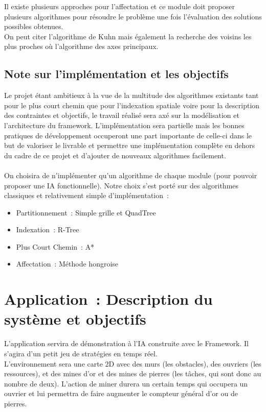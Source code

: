 Il existe plusieurs approches pour l'affectation et ce module doit proposer plusieurs algorithmes pour résoudre le problème une fois l'évaluation des solutions possibles obtenues.\\
On peut citer l'algorithme de Kuhn mais également la recherche des voisins les plus proches où l'algorithme des axes principaux.

\subsection{Note sur l'implémentation et les objectifs}

Le projet étant ambitieux à la vue de la multitude des algorithmes existants tant pour le plus court chemin que pour l'indexation spatiale voire pour la description des contraintes et objectifs, le travail réalisé sera axé sur la modélisation et l'architecture du framework. L'implémentation sera partielle mais les bonnes pratiques de développement occuperont une part importante de celle-ci dans le but de valoriser le livrable et permettre une implémentation complète en dehors du cadre de ce projet et d'ajouter de nouveaux algorithmes facilement.\\\\

On choisira de n'implémenter qu'un algorithme de chaque module (pour pouvoir proposer une IA fonctionnelle). Notre choix s'est porté sur des algorithmes classiques et relativement simple d'implémentation~:
\begin{itemize}
\item Partitionnement~: Simple grille et QuadTree
\item Indexation~: R-Tree
\item Plus Court Chemin~: A*
\item Affectation~: Méthode hongroise
\end{itemize}

\section{Application~: Description du système et objectifs}

L'application servira de démonstration à l'IA construite avec le Framework. Il s'agira d'un petit jeu de stratégies en temps réel.\\
L'environnement sera une carte 2D avec des murs (les obstacles), des ouvriers (les ressources), et des mines d'or et des mines de pierres (les tâches, qui sont donc au nombre de deux). L'action de miner durera un certain temps qui occupera un ouvrier et lui permettra de faire augmenter le compteur général d'or ou de pierres.\\\\

